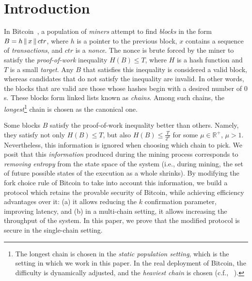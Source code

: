 \section{Introduction}

In Bitcoin~\cite{bitcoin}, a population of \emph{miners}
attempt to find \emph{blocks} in the form $B = h \,\|\, x \,\|\, ctr$,
where $h$ is a pointer to the previous block, $x$ contains a sequence of
\emph{transactions}, and $ctr$ is a \emph{nonce}. The nonce is brute forced
by the miner to satisfy the \emph{proof-of-work} inequality $H(B) \leq T$, where
$H$ is a hash function and $T$ is a small \emph{target}. Any $B$ that satisfies this
inequality is considered a valid block, whereas candidates that do not satisfy
the inequality are invalid. In other words, the blocks that are valid are those
whose hashes begin with a desired number of $0$s.
These blocks form linked lists known as \emph{chains}.
Among such chains, the \emph{longest}\footnote{The
longest chain is chosen in the \emph{static population setting}, which is the
setting in which we work in this paper. In the real deployment of Bitcoin, the
difficulty is dynamically adjusted, and the \emph{heaviest chain} is chosen (c.f.,
~\cite{varbackbone}).} chain is chosen as the canonical one.

Some blocks $B$ satisfy the proof-of-work inequality better than others.
Namely, they satisfy not only $H(B) \leq T$, but also $H(B) \leq \frac{T}{2^\mu}$
for some $\mu \in \mathbb{R}^+$, $\mu > 1$. Nevertheless, this information is ignored when choosing
which chain to pick. We posit that this \emph{information}
produced during the mining process corresponds to \emph{removing entropy} from the
state space of the system (i.e., during mining, the set of future possible states
of the execution as a whole shrinks).
By modifying the fork choice rule of Bitcoin to take into account this information,
we build a protocol which retains the provable security of Bitcoin, while achieving
efficiency advantages over it: (a) it allows reducing the $k$ confirmation parameter,
improving latency, and (b) in a multi-chain setting, it allows increasing the throughput
of the system. In this paper, we prove that the modified protocol is secure in the
single-chain setting.

